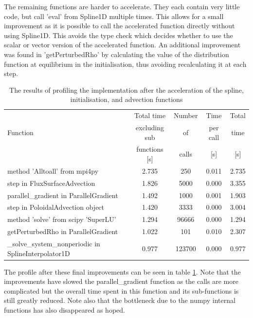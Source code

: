 The remaining functions are harder to accelerate. They each contain very little code, but call 'eval' from Spline1D multiple times. This allows for a small improvement as it is possible to call the accelerated function directly without using Spline1D. This avoids the type check which decides whether to use the scalar or vector version of the accelerated function. An additional improvement was found in 'getPerturbedRho' by calculating the value of the distribution function at equilibrium in the initialisation, thus avoiding recalculating it at each step.

\begin{table}[ht]
\centering
 \begin{tabular}{|m{}|c|c|c|c|}
  \hline
          & Total time & Number & Time & Total \\
  Function & excluding sub & of & per call & time \\
          & functions [s] & calls & [s] & [s] \\
  \hline
  \hline
  method 'Alltoall' from mpi4py & 2.735 & 250 & 0.011 & 2.735 \\
  \hline
  step in FluxSurfaceAdvection & 1.826 & 5000 & 0.000 & 3.355 \\
  \hline
  parallel\_gradient in ParallelGradient & 1.492 & 1000 & 0.001 & 1.903\\
  \hline
  step in PoloidalAdvection object & 1.420 & 3333 & 0.000 & 3.004\\
  \hline
  method 'solve' from scipy 'SuperLU' & 1.294 & 96666 & 0.000 & 1.294\\
  \hline
  getPerturbedRho in ParallelGradient & 1.022 & 101 & 0.010 & 2.307\\
  \hline
  \_solve\_system\_nonperiodic in SplineInterpolator1D & 0.977 & 123700 & 0.000 & 0.977\\
  \hline
 \end{tabular}
 \caption{\label{tab::final profile} The results of profiling the implementation after the acceleration of the spline, initialisation, and advection functions}
\end{table}

The profile after these final improvements can be seen in table \ref{tab::final profile}. Note that the improvements have slowed the parallel\_gradient function as the calls are more complicated but the overall time spent in this function and its sub-functions is still greatly reduced. Note also that the bottleneck due to the numpy internal functions has also disappeared as hoped.

